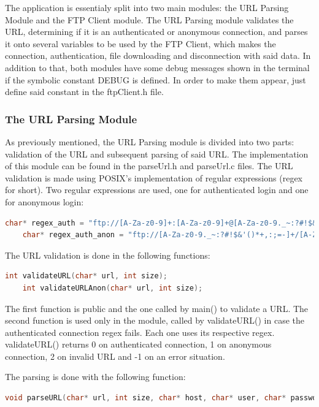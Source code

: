 \documentclass[11pt,a4paper,reqno]{article}
\numberwithin{equation}{section}
\begin{document}
	The application is essentialy split into two main modules: the URL Parsing Module and the FTP Client module. The URL Parsing module validates the URL, determining if it is an authenticated or anonymous connection, and parses it onto several variables to be used by the FTP Client, which makes the connection, authentication, file downloading and disconnection with said data. In addition to that, both modules have some debug messages shown in the terminal if the symbolic constant DEBUG is defined. In order to make them appear, just define said constant in the ftpClient.h file.

	\subsubsection{The URL Parsing Module}

	As previously mentioned, the URL Parsing module is divided into two parts: validation of the URL and subsequent parsing of said URL. The implementation of this module can be found in the parseUrl.h and parseUrl.c files.
The URL validation is made using POSIX’s implementation of regular expressions (regex for short). Two regular expressions are used, one for authenticated login and one for anonymous login:

	\begin{lstlisting}[language=C, breaklines=true]
	char* regex_auth = "ftp://[A-Za-z0-9]+:[A-Za-z0-9]+@[A-Za-z0-9._~:?#!$&'()*+,:;=-]+/[A-Za-z0-9._~:/?#@!$&'()*+,:;=-]+";
	char* regex_auth_anon = "ftp://[A-Za-z0-9._~:?#!$&'()*+,:;=-]+/[A-Za-z0-9._~:/?#@!$&'()*+,:;=-]+";
	\end{lstlisting}

	The URL validation is done in the following functions:

	\begin{lstlisting}[language=C, breaklines=true]
	int validateURL(char* url, int size);
	int validateURLAnon(char* url, int size);
	\end{lstlisting}

	The first function is public and the one called by main() to validate a URL. The second function is used only in the module, called by validateURL() in case the authenticated connection regex fails. Each one uses its respective regex. validateURL() returns 0 on authenticated connection, 1 on anonymous connection, 2 on invalid URL and -1 on an error situation.
	
	The parsing is done with the following function:

	\begin{lstlisting}[language=C, breaklines=true]
	void parseURL(char* url, int size, char* host, char* user, char* password, char* path, int anon);
	\end{lstlisting}
\end{document}
